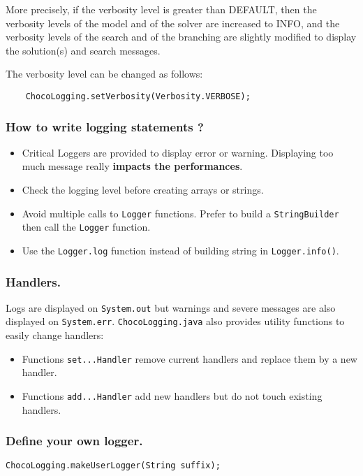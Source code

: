 More precisely, if the verbosity level is greater than DEFAULT, then the verbosity levels of the model and of the solver are increased to INFO, and the verbosity levels of the search and of the branching are slightly modified to display the solution(s) and search messages.

The verbosity level can be changed as follows:
\begin{lstlisting}
	ChocoLogging.setVerbosity(Verbosity.VERBOSE);
\end{lstlisting}


\subsubsection{How to write logging statements ?}\label{advanced:howtowriteloggingstatements}\hypertarget{advanced:howtowriteloggingstatements}{}

\begin{itemize}
	\item Critical Loggers are provided to display error or warning. Displaying too much message really \textbf{impacts the performances}.
	\item Check the logging level before creating arrays or strings.
	\item Avoid multiple calls to \texttt{Logger} functions. Prefer to build a \texttt{StringBuilder} then call the \texttt{Logger} function.
	\item Use the \texttt{Logger.log} function instead of building string in \texttt{Logger.info()}.
\end{itemize}

\subsubsection{Handlers.}\label{advanced:handlers}\hypertarget{advanced:handlers}{}
Logs are displayed on \texttt{System.out} but warnings and severe messages are also displayed on \texttt{System.err}.
\texttt{ChocoLogging.java} also provides utility functions to easily change handlers:
\begin{itemize}
	\item Functions \texttt{set...Handler} remove current handlers and replace them by a new handler.
	\item Functions \texttt{add...Handler} add new handlers but do not touch existing handlers.
\end{itemize}

\subsubsection{Define your own logger.}\label{advanced:defineyourownlogger}\hypertarget{advanced:defineyourownlogger}{}
\begin{lstlisting}
ChocoLogging.makeUserLogger(String suffix);
\end{lstlisting}

